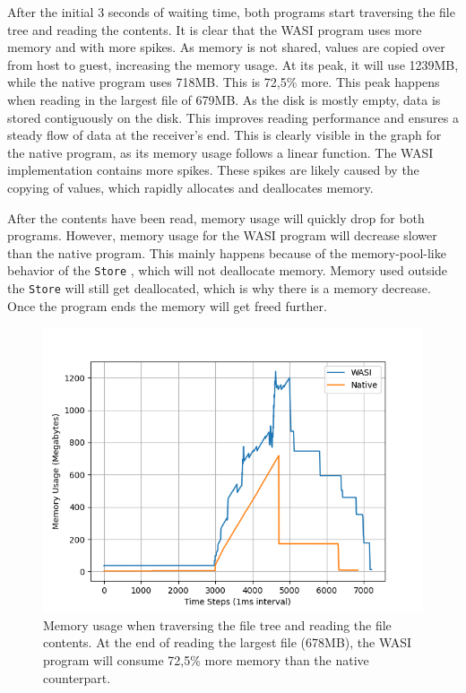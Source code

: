 After the initial 3 seconds of waiting time, both programs start traversing the file tree and reading the contents. It is clear that the \acrshort{WASI} program uses more memory and with more spikes. As memory is not shared, values are copied over from host to guest, increasing the memory usage. At its peak, it will use 1239MB, while the native program uses 718MB. This is 72,5\% more. This peak happens when reading in the largest file of 679MB. As the disk is mostly empty, data is stored contiguously on the disk. This improves reading performance and ensures a steady flow of data at the receiver's end. This is clearly visible in the graph for the native program, as its memory usage follows a linear function. The \acrshort{WASI} implementation contains more spikes. These spikes are likely caused by the copying of values, which rapidly allocates and deallocates memory.

After the contents have been read, memory usage will quickly drop for both programs. However, memory usage for the \acrshort{WASI} program will decrease slower than the native program. This mainly happens because of the memory-pool-like behavior of the \texttt{Store} \cite{wasmtime_store}, which will not deallocate memory. Memory used outside the \texttt{Store} will still get deallocated, which is why there is a memory decrease. Once the program ends the memory will get freed further.

\begin{figure}[H]
  \centering
  \includegraphics[width=1\textwidth]{images/mass_storage_comparison.png}
  \caption{Memory usage when traversing the file tree and reading the file contents. At the end of reading the largest file (678MB), the \acrshort{WASI} program will consume 72,5\% more memory than the native counterpart.}
  \label{fig:mass_storage_memory_comparison}
\end{figure}



